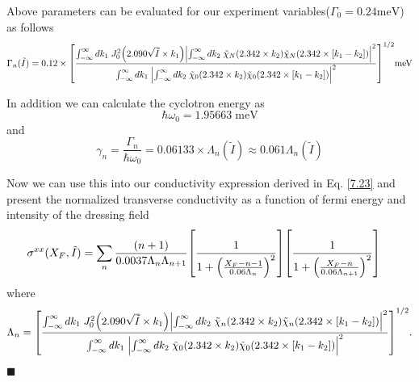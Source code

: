 Above parameters can be evaluated for our experiment variables($\Gamma_0 = 0.24 \text{meV}$) as follows
\begin{equation} \label{8.2}
  \Gamma_n(\tilde{I}) = 0.12\times
  \qty[
  \frac
  {\int_{-\infty}^{\infty} d {k}_1 \;
  J_0^2\qty(2.090\sqrt{\tilde{I}}\times{k}_1)
  \qty|
  \int_{-\infty}^{\infty} d{k}_2 \;
  \tilde{\chi}_{N}\qty(2.342 \times k_2)
  \tilde{\chi}_{N}\qty(2.342 \times \qty[{k}_1 - {k}_2])|^2}
  {\int_{-\infty}^{\infty} d {k}_1 \;
  \qty|
  \int_{-\infty}^{\infty} d{k}_2 \;
  \tilde{\chi}_{0}\qty(2.342 \times k_2)
  \tilde{\chi}_{0}\qty(2.342 \times \qty[{k}_1 - {k}_2])|^2}
  ]^{1/2} \text{meV}
\end{equation}

\noindent
In addition we can calculate the cyclotron energy as
\begin{equation} \label{8.3}
  \hbar\omega_0 = 1.95663 \;\text{meV}
\end{equation}
and
\begin{equation} \label{8.4}
  \gamma_n = \frac{\Gamma_n}{\hbar \omega_0} = 0.06133 \times \Lambda_n(\tilde{I}) \approx 0.061 \Lambda_n(\tilde{I})
\end{equation}

\noindent
Now we can use this into our conductivity expression derived in Eq. \eqref{7.23} and present the normalized transverse conductivity as a function of fermi energy and intensity of the dressing field
\begin{equation} \label{8.5}
  \begin{aligned}
    \sigma^{xx}(X_F,\tilde{I}) & =
    \sum_{n}
    \frac{\qty(n+1)}{0.0037\Lambda_n \Lambda_{n+1}}
    \qty[
      \frac{1}
      {
        1 + \qty(\frac{X_F - n -1}{0.06\Lambda_n})^2
      }
    ]
    \qty[
      \frac{1}
      {
        1 + \qty(\frac{X_F - n}{0.06\Lambda_{n+1}})^2
      }
    ]
  \end{aligned}
\end{equation}
where
\begin{equation} \label{8.6}
    \Lambda_n  =
    \qty[
    \frac
    {\int_{-\infty}^{\infty} d {k}_1 \;
    J_0^2\qty(2.090\sqrt{\tilde{I}}\times{k}_1)
    \qty|
    \int_{-\infty}^{\infty} d{k}_2 \;
    \tilde{\chi}_{n}\qty(2.342 \times k_2)
    \tilde{\chi}_{n}\qty(2.342 \times \qty[{k}_1 - {k}_2])|^2}
    {\int_{-\infty}^{\infty} d {k}_1 \;
    \qty|
    \int_{-\infty}^{\infty} d{k}_2 \;
    \tilde{\chi}_{0}\qty(2.342 \times k_2)
    \tilde{\chi}_{0}\qty(2.342 \times \qty[{k}_1 - {k}_2])|^2}
    ]^{1/2}.
\end{equation}
\hfill$\blacksquare$

